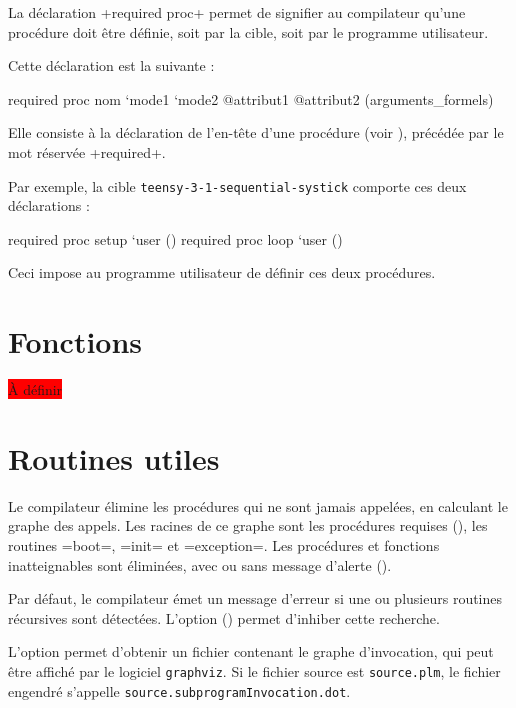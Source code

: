 
La déclaration \plm+required proc+ permet de signifier au compilateur qu'une procédure doit être définie, soit par la cible, soit par le programme utilisateur.

Cette déclaration est la suivante :
\begin{PLM}
required proc nom `mode1 `mode2 @attribut1 @attribut2 (arguments_formels)
\end{PLM}

Elle consiste à la déclaration de l'en-tête d'une procédure (voir ), précédée par le mot réservée \plm+required+.

Par exemple, la cible \texttt{teensy-3-1-sequential-systick} comporte ces deux déclarations :

\begin{PLM}
required proc setup `user ()
required proc loop `user ()
\end{PLM}

Ceci impose au programme utilisateur de définir ces deux procédures.









\section{Fonctions}

\colorbox{red}{À définir}







\section{Routines utiles}

Le compilateur élimine les procédures qui ne sont jamais appelées, en calculant le graphe des appels. Les racines de ce graphe sont les procédures requises (), les routines \plm=boot=, \plm=init= et \plm=exception=. Les procédures et fonctions inatteignables sont éliminées, avec ou sans message d'alerte ().












Par défaut, le compilateur émet un message d'erreur si une ou plusieurs routines récursives sont détectées. L'option  () permet d'inhiber cette recherche.

L'option  permet d'obtenir un fichier contenant le graphe d'invocation, qui peut être affiché par le logiciel \texttt{graphviz}. Si le fichier source est \texttt{source.plm}, le fichier engendré s'appelle \texttt{source.subprogramInvocation.dot}.

